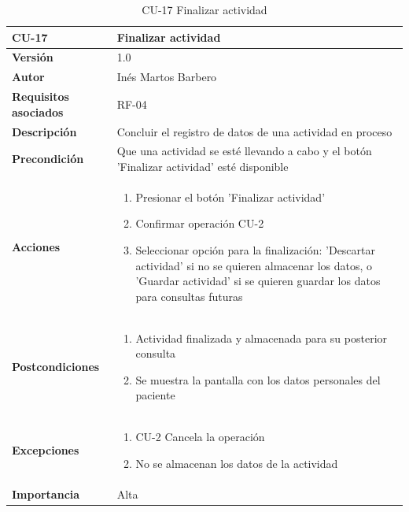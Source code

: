 \begin{table}[p]
	\centering
	\begin{tabularx}{\linewidth}{ p{} p{} }
		\toprule
		\textbf{CU-17}    & \textbf{Finalizar actividad}\\
		\toprule
		\textbf{Versión}              & 1.0    \\
		\textbf{Autor}                & Inés Martos Barbero \\
		\textbf{Requisitos asociados} & RF-04 \\
		\textbf{Descripción}          & Concluir el registro de datos de una actividad en proceso \\
		\textbf{Precondición}         & Que una actividad se esté llevando a cabo y el botón 'Finalizar actividad' esté disponible \\
		\textbf{Acciones}             &
		\begin{enumerate}
			\def\labelenumi{\arabic{enumi}.}
			\tightlist
			\item Presionar el botón 'Finalizar actividad'
			\item Confirmar operación CU-2
            \item Seleccionar opción para la finalización: 'Descartar actividad' si no se quieren almacenar los datos, o 'Guardar actividad' si se quieren guardar los datos para consultas futuras
		\end{enumerate}\\
		\textbf{Postcondiciones}        & 
        \begin{enumerate}
			\def\labelenumi{\arabic{enumi}.}
			\tightlist
			\item Actividad finalizada y almacenada para su posterior consulta
			\item Se muestra la pantalla con los datos personales del paciente
		\end{enumerate}\\
		\textbf{Excepciones}          & 
        \begin{enumerate}
			\def\labelenumi{\arabic{enumi}.}
			\tightlist
			\item CU-2 Cancela la operación
			\item No se almacenan los datos de la actividad
		\end{enumerate}\\
		\textbf{Importancia}          & Alta  \\
		\bottomrule
	\end{tabularx}
	\caption{CU-17 Finalizar actividad}
    \label{CU-17}
\end{table}

